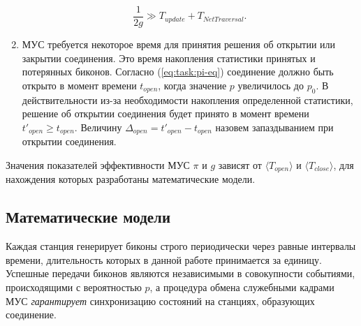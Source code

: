 \begin{enumerate}
\begin{equation}
\label{eq:task:Tinfo}
\frac{1}{2g} \gg T_{update} + T_{NetTraversal}.
\end{equation}
\item МУС требуется некоторое время для принятия решения об открытии или закрытии соединения. Это время накопления статистики принятых и потерянных биконов. Согласно (\ref{eq:task:pi-eq}) соединение должно быть открыто в момент времени $t_{open}$, когда значение $p$ увеличилось до $p_0$. В действительности из-за необходимости накопления определенной статистики, решение об открытии соединения будет принято в момент времени $t'_{open} \geq t_{open}$. Величину $\Delta_{open} = t'_{open} - t_{open} $ назовем запаздыванием при открытии соединения. 
\end{enumerate}

Значения показателей эффективности МУС $\pi$  и $g$ зависят от $\langle T_{open}\rangle $ и $\langle T_{close}\rangle$, для нахождения которых разработаны математические модели.


% 
\subsection{Математические модели}
\label{section:model}
Каждая станция генерирует биконы строго периодически через равные интервалы времени, длительность которых в данной работе принимается за единицу. Успешные передачи биконов являются независимыми в совокупности событиями, происходящими с вероятностью $p$, а процедура обмена служебными кадрами МУС \emph{гарантирует} синхронизацию состояний на станциях, образующих соединение.

